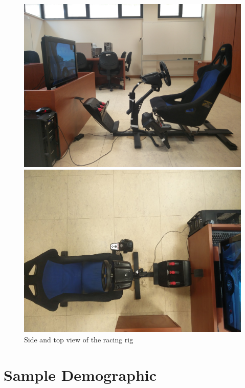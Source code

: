 \begin{figure}
	\centering
	\begin{minipage}{0.45\textwidth}
		\centering
		\includegraphics[width=\textwidth]{images/RacingRig}
	\end{minipage}\hfill
	\begin{minipage}{0.45\textwidth}
		\centering
		\includegraphics[width=\textwidth]{images/RacingRig2}
	\end{minipage}
	\caption[Side and top view of the racing rig]{Side and top view of the racing rig}
	\label{sec:eval-simRacingRig}
\end{figure}

\section{Sample Demographic}
\label{sec:eval-demographic}

